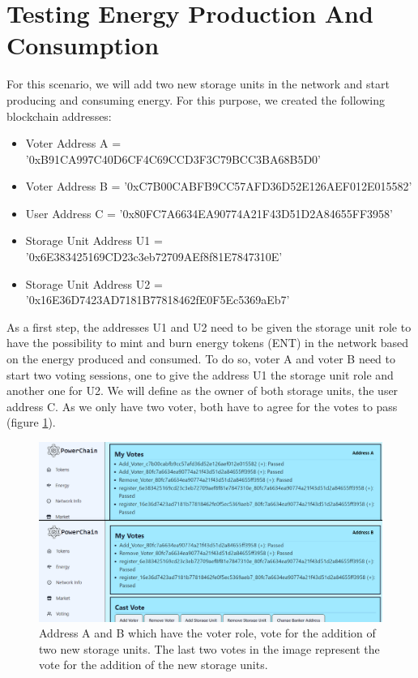\section{Testing Energy Production And Consumption}
For this scenario, we will add two new storage units in the network and start producing and consuming energy.
For this purpose, we created the following blockchain addresses:
\begin{itemize}
    \item Voter Address A = '0xB91CA997C40D6CF4C69CCD3F3C79BCC3BA68B5D0'
    \item Voter Address B = '0xC7B00CABFB9CC57AFD36D52E126AEF012E015582'
    \item User Address C = '0x80FC7A6634EA90774A21F43D51D2A84655FF3958'
    \item Storage Unit Address U1 = '0x6E383425169CD23c3eb72709AEf8f81E7847310E'
    \item Storage Unit Address U2 = '0x16E36D7423AD7181B77818462fE0F5Ec5369aEb7'
\end{itemize}
As a first step, the addresses U1 and U2 need to be given the storage unit role to have the possibility to mint and burn
energy tokens (ENT) in the network based on the energy produced and consumed. To do so, voter A and voter B need to start two voting
sessions, one to give the address U1 the storage unit role and another one for U2. We will define as the owner of both storage units, the
user address C. As we only have two voter, both have to agree for the votes to pass (figure \ref{fig:add_units}).\\
\begin{figure}[h!]
    \centering
    \includegraphics[width=\linewidth,frame,scale=1]{Figures/add_units.png}
    \caption{Address A and B which have the voter role, vote for the addition of two new storage units. The last two votes in the image represent the vote for the addition of the new storage units.}
    \label{fig:add_units}
\end{figure}

